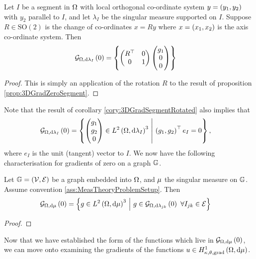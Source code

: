 
\begin{cory} \label{cory:3DGradSegmentRotated}
	Let $I$ be a segment in $\Omega$ with local orthogonal co-ordinate system  $y=\left( y_1,y_2 \right)$ with $y_2$ parallel to $I$, and let $\lambda_I$ be the singular measure supported on $I$.
	Suppose $R\in\mathrm{SO}(2)$ is the change of co-ordinates $x=Ry$ where $x=\left( x_1,x_2 \right)$ is the axis co-ordinate system.
	Then
	\begin{align*}
		\mathcal{G}_{ \Omega, \mathrm{d}\lambda_I}\left( 0 \right) &= 
		\left\{  \begin{pmatrix} R^\top & 0 \\ 0 & 1 \end{pmatrix} \begin{pmatrix} g_1 \\ 0 \\ 0 \end{pmatrix}  \right\}
	\end{align*}
\end{cory}
\begin{proof}
	This is simply an application of the rotation $R$ to the result of proposition \ref{prop:3DGradZeroSegment}.
\end{proof}
Note that the result of corollary \ref{cory:3DGradSegmentRotated} also implies that
\begin{align*}
	\mathcal{G}_{ \Omega, \mathrm{d}\lambda_I}\left( 0 \right) &= 
		\left\{  \begin{pmatrix} g_1 \\ g_2 \\ 0 \end{pmatrix}\in L^{2}\left( \Omega,\mathrm{d}\lambda_I \right)^3 \ \middle\vert \  \left( g_1, g_2 \right)^\top e_I = 0  \right\},
\end{align*}
where $e_I$ is the unit (tangent) vector to $I$.
We now have the following characterisation for gradients of zero on a graph $\mathbb{G}$.

\begin{prop} \label{prop:3DGradZeroCharacterisation}
	Let $\mathbb{G}=\left( \mathcal{V}, \mathcal{E} \right)$ be a graph embedded into $\Omega$, and $\mu$ the singular measure on $\mathbb{G}$.
	Assume convention \ref{ass:MeasTheoryProblemSetup}.
	Then
	\begin{align*}
		\gradZero{\ddom}{\ddmes} &= \clbracs{ g\in\ltwo{\ddom}{\ddmes}^3 \setVert g\in\gradZero{\ddom}{\lambda_{jk}} \ \forall I_{jk}\in\edgeSet }
	\end{align*}
\end{prop}
\begin{proof}
\end{proof}
Now that we have established the form of the functions which live in $\mathcal{G}_{ \Omega, \mathrm{d}\mu}\left( 0 \right)$, we can move onto examining the gradients of the functions $u\in H^1_{\kappa,\theta,\mathrm{grad}}\left( \Omega, \mathrm{d}\mu \right)$.

